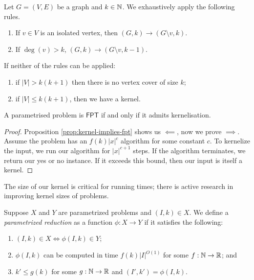 \begin{algorithm}
	Let $G = (V,E)$ be a graph and $k \in \mathbb{N}$.
	We exhaustively apply the following rules.
	\begin{enumerate}
		\item If $v \in V$ is an isolated vertex, then 
			$(G, k) \to (G \setminus v, k)$.

		\item If $\deg(v) > k$, $(G,k) \to (G \setminus v, k - 1)$.
	\end{enumerate}
	If neither of the rules can be applied:
	\begin{enumerate}
		\item if $\left\lvert V \right\rvert > k(k+1)$
			then there is no vertex cover of size $k$;
		\item if $\left\lvert V \right\rvert \leq k(k+1)$,
			then we have a kernel.
	\end{enumerate}
\end{algorithm}

\begin{theorem}[]
	A parametrised problem is $\mathsf{FPT}$
	if and only if it admits kernelisation.
\end{theorem}

\begin{proof}
	Proposition \ref{prop:kernel-implies-fpt} shows us $\impliedby$,
	now we prove $\implies$.
	Assume the problem has an $f(k) \left\lvert x \right\rvert^c$ algorithm
	for some constant $c$.
	To kernelize the input, we
	run our algorithm for
	$\left\lvert x \right\rvert^{c+1}$
	steps.
	If the algorithm terminates, we return our yes or no instance.
	If it exceeds this bound, then our input is itself a kernel.
\end{proof}

\begin{remark}
	The size of our kernel is critical for running times;
	there is active research in improving kernel sizes of problems.
\end{remark}

\begin{definition}
	Suppose $X$ and $Y$ are parametrized problems
	and $(I, k) \in X$.
	We define a \emph{parametrized reduction} as a function
	$\phi: X \to Y$
	if it satisfies the following:
	\begin{enumerate}
		\item $(I,k) \in X \iff \phi(I,k) \in Y$;
		\item $\phi(I,k)$ can be computed in time
			$f(k) \left\lvert I \right\rvert^{O(1)}$
			for some $f: \mathbb{N} \to \mathbb{R}$; and
	\item $k' \leq g(k)$ for some $g: \mathbb{N} \to \mathbb{R}$
		and $(I', k') = \phi(I, k)$.
	\end{enumerate}
\end{definition}

